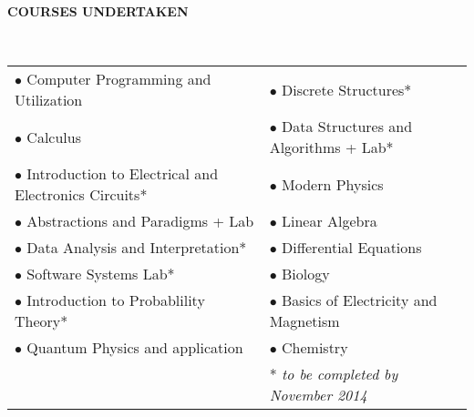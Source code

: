 \documentclass[a4paper,10pt]{article}
\newcommand{\resheading}[1]{{\small \colorbox{mygrey}{\begin{minipage}{0.975\textwidth}{\textbf{#1 \vphantom{p\^{E}}}}\end{minipage}}}}
\begin{document}
\resheading{\textbf{COURSES UNDERTAKEN} } \\
  \begin{centering}
  \setlength{\tabcolsep}{1em}
  \begin{tabular}{l l}
    \hspace*{1cm} $\bullet$ Computer Programming and Utilization & $ \bullet $ Discrete Structures* \\
    \hspace*{1cm} $\bullet$ Calculus & $\bullet$ Data Structures and Algorithms + Lab* \\
    \hspace*{1cm} $\bullet$ Introduction to Electrical and Electronics Circuits* & $\bullet$ Modern Physics  \\
    \hspace*{1cm} $\bullet$ Abstractions and Paradigms + Lab & $\bullet$ Linear Algebra  \\
    \hspace*{1cm} $\bullet$ Data Analysis and Interpretation* & $\bullet$ Differential Equations  \\
    \hspace*{1cm} $\bullet$ Software Systems Lab* & $\bullet$ Biology  \\
    \hspace*{1cm} $\bullet$ Introduction to Probablility Theory* & $\bullet$ Basics of Electricity and Magnetism \\
    \hspace*{1cm} $\bullet$ Quantum Physics and application & $\bullet$ Chemistry \\
    & \hspace*{23mm} * {\it to be completed by November 2014}
  \end{tabular}
  \end{centering}
\end{document}
